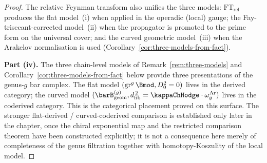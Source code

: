 \begin{proof}
The relative Feynman transform also unifies the three models:
$\mathrm{FT}_{\mathrm{rel}}$ produces the flat model~(i) when
applied in the operadic (local) gauge;
the Fay-trisecant-corrected model~(ii) when the propagator is
promoted to the prime form on the universal cover; and the
curved geometric model~(iii) when the Arakelov normalisation
is used (Corollary~\ref{cor:three-models-from-fact}).

\smallskip\noindent
\textbf{Part (iv).} The three chain-level models of
Remark~\ref{rem:three-models} and
Corollary~\ref{cor:three-models-from-fact} below
provide three presentations of the genus-$g$ bar complex.
The flat model $(\mathrm{gr}^g\, \Bmod, D_0^2 = 0)$ lives in the
derived category; the curved model
$(\barB^{(g)}_{\mathrm{geom}}, \dfib^{\,2} = \kappaChHodge \cdot
\omega_g^{\mathrm{Ar}})$ lives in the coderived category. This is the
categorical placement proved on this surface. The stronger
flat-derived / curved-coderived comparison is established only
later in the chapter, once the chiral exponential map and the
restricted comparison theorem have been constructed explicitly;
it is not a consequence here merely of completeness of the genus
filtration together with homotopy-Koszulity of the local model.
\end{proof}

